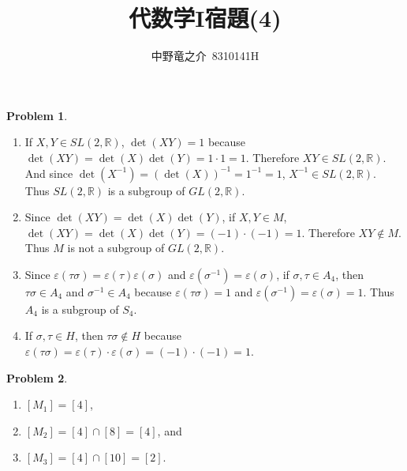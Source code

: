\documentclass[a4paper, 12pt, fleqn]{article}
\title{代数学I宿題(4)}
\author{中野竜之介\ 8310141H}
\theoremstyle{definition}
\newtheorem{prb}{Problem}
\begin{document}
\maketitle

\begin{prb}
    $ $
        \begin{enumerate}
        \item If $X,Y \in SL(2,\mathbb{R})$, $\det(XY)=1$ because $\det(XY)=\det(X)\det(Y)=1\cdot 1=1$. Therefore $XY\in SL(2,\mathbb{R})$. And since $\det(X^{-1})=(\det(X))^{-1}=1^{-1}=1$, $X^{-1}\in SL(2,\mathbb{R})$. Thus $SL(2,\mathbb{R})$ is a subgroup of $GL(2,\mathbb{R})$.
    
        \item Since $\det(XY)=\det(X)\det(Y)$, if $X,Y\in M$, $\det(XY)=\det(X)\det(Y) = (-1)\cdot (-1) = 1$. Therefore $XY \not \in M$. Thus $M$ is not a subgroup of $GL(2,\mathbb{R})$.  
        
        \item Since $\varepsilon (\tau \sigma) = \varepsilon (\tau) \varepsilon (\sigma)$ and $\varepsilon (\sigma ^{-1}) = \varepsilon (\sigma)$, if $\sigma ,\tau \in A_4$, then $\tau \sigma \in A_4$ and $\sigma ^{-1} \in A_4$ because $\varepsilon (\tau \sigma) = 1$ and $\varepsilon (\sigma ^{-1}) = \varepsilon (\sigma ) = 1$. Thus $A_4$ is a subgroup of $S_4$. 
        
        \item If $\sigma ,\tau \in H$, then $\tau \sigma \notin H$ because $\varepsilon(\tau \sigma) = \varepsilon (\tau)\cdot \varepsilon(\sigma) = (-1)\cdot (-1) = 1$.
    \end{enumerate}
\end{prb}

\begin{prb}
    $ $
    \begin{enumerate}
        \item $[M_1] = [4]$,
        \item $[M_2] = [4] \cap [8] = [4]$, and
        \item $[M_3] = [4] \cap [10] = [2]$.
    \end{enumerate}
\end{prb}
\end{document}
